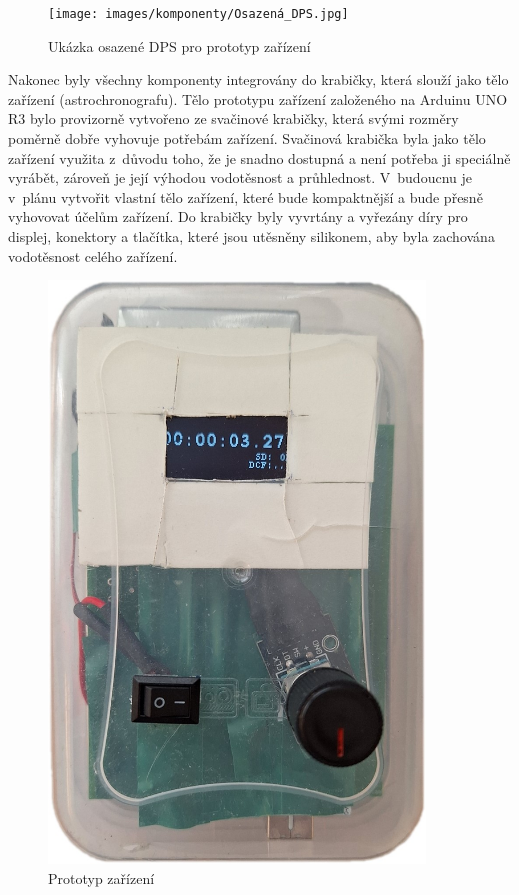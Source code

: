 \begin{figure}[H]
	\centering
	\texttt{[image: images/komponenty/Osazená\_DPS.jpg]}
	\caption{Ukázka osazené DPS pro prototyp zařízení}
\end{figure}

Nakonec byly všechny komponenty integrovány do krabičky, která slouží jako tělo zařízení (astrochronografu). Tělo prototypu zařízení založeného na Arduinu UNO R3 bylo provizorně vytvořeno ze svačinové krabičky, která svými rozměry poměrně dobře vyhovuje potřebám zařízení. Svačinová krabička byla jako tělo zařízení využita z~důvodu toho, že je snadno dostupná a není potřeba ji speciálně vyrábět, zároveň je její výhodou vodotěsnost a průhlednost. V~budoucnu je v~plánu vytvořit vlastní tělo zařízení, které bude kompaktnější a bude přesně vyhovovat účelům zařízení. Do krabičky byly vyvrtány a vyřezány díry pro displej, konektory a tlačítka, které jsou utěsněny silikonem, aby byla zachována vodotěsnost celého zařízení.

\begin{figure}[H]
	\centering
	\includegraphics[width=10cm]{images/komponenty/prototyp2.jpg}
	\caption{Prototyp zařízení}
\end{figure}